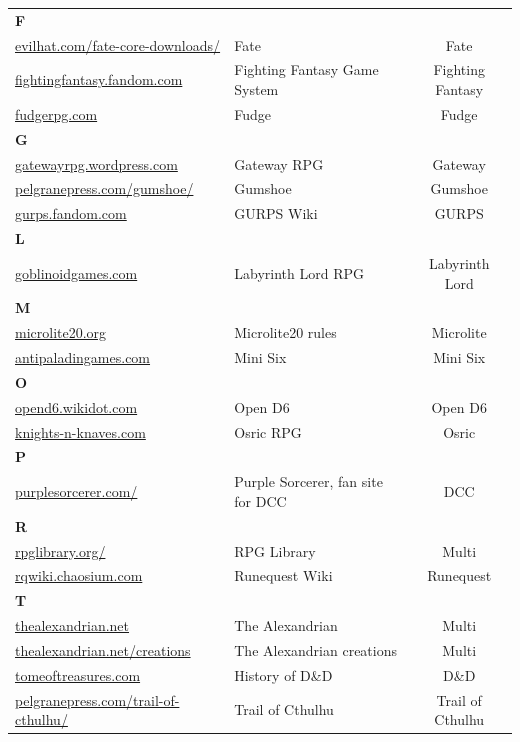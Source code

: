 \documentclass[a4paper, 11pt, twoside]{article}
\begin{document}
\begin{longtable}{llc}
\textbf{F} &  & \\
\href{https://www.evilhat.com/home/fate-core-downloads/}{evilhat.com/fate-core-downloads/} & Fate & Fate\\
\href{https://fightingfantasy.fandom.com/wiki/Game\_System}{fightingfantasy.fandom.com} & Fighting Fantasy Game System & Fighting Fantasy\\
\href{https://fudgerpg.com/goodies/fudge-files.html}{fudgerpg.com} & Fudge & Fudge\\
\textbf{G} &  & \\
\href{https://gatewayrpg.wordpress.com}{gatewayrpg.wordpress.com} & Gateway RPG & Gateway\\
\href{https://site.pelgranepress.com/index.php/gumshoe/}{pelgranepress.com/gumshoe/} & Gumshoe & Gumshoe\\
\href{https://gurps.fandom.com/wiki/Main\_Page}{gurps.fandom.com} & GURPS Wiki & GURPS\\
\textbf{L} &  & \\
\href{https://goblinoidgames.com/index.php/downloads/}{goblinoidgames.com} & Labyrinth Lord RPG & Labyrinth Lord\\
\textbf{M} &  & \\
\href{https://microlite20.org/community/viewforum.php?f=15}{microlite20.org} & Microlite20 rules & Microlite\\
\href{http://www.antipaladingames.com/}{antipaladingames.com} & Mini Six & Mini Six\\
\textbf{O} &  & \\
\href{http://opend6.wikidot.com/}{opend6.wikidot.com} & Open D6 & Open D6\\
\href{https://www.knights-n-knaves.com}{knights-n-knaves.com} & Osric RPG & Osric\\
\textbf{P} &  & \\
\href{https://purplesorcerer.com/}{purplesorcerer.com/} & Purple Sorcerer, fan site for DCC & DCC\\
\textbf{R} &  & \\
\href{https://www.rpglibrary.org/}{rpglibrary.org/} & RPG Library & Multi\\
\href{https://rqwiki.chaosium.com/}{rqwiki.chaosium.com} & Runequest Wiki & Runequest\\
\textbf{T} &  & \\
\href{http://thealexandrian.net/index.html}{thealexandrian.net} & The Alexandrian & Multi\\
\href{http://www.thealexandrian.net/creations/creations.html}{thealexandrian.net/creations} & The Alexandrian creations & Multi\\
\href{http://www.tomeoftreasures.com/tot\_adnd/adnd\_history.htm}{tomeoftreasures.com} & History of D\&D & D\&D\\
\href{http://site.pelgranepress.com/index.php/category/products/trail-of-cthulhu/}{pelgranepress.com/trail-of-cthulhu/} & Trail of Cthulhu & Trail of Cthulhu\\
\end{longtable}
\end{document}
